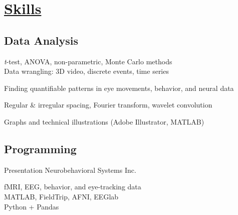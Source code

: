 \documentclass[]{winter-resume-openfont}
\begin{document}
\hfill
\begin{minipage}[t]{0.3\textwidth} 



\sectionsep
\sectionsep


\section{\underline{Skills}}
\sectionsep
\subsection{Data Analysis}
\textbullet{} \emph{t}-test, ANOVA, non-parametric, Monte Carlo methods \\
\sectionsep
\textbullet{} Data wrangling: 3D video, discrete events, time series
\sectionsep
 

\textbullet{} Finding quantifiable patterns in eye movements, behavior, and neural data \\
\sectionsep
 
\textbullet{}  Regular \& irregular spacing, Fourier transform, wavelet convolution \\
\sectionsep
 

\textbullet{}  Graphs and technical illustrations (Adobe Illustrator, MATLAB) \\
 
 \sectionsep
\sectionsep
\subsection{Programming}
\textbullet{}  Presentation Neurobehavioral Systems Inc. \\
\sectionsep
 

\textbullet{}  fMRI, EEG, behavior, and eye-tracking data \\
\sectionsep
\textbullet{}  MATLAB, FieldTrip, AFNI, EEGlab \\
\sectionsep
\textbullet{}  Python + Pandas \\

\sectionsep
\sectionsep

\end{minipage}
\end{document}
